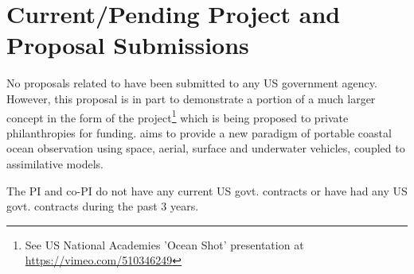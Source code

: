 \section{Current/Pending Project and Proposal Submissions}
\label{sec:current}

No proposals related to \proj have been submitted to any US government
agency. However, this proposal is in part to demonstrate a portion of
a much larger concept in the form of the \met project\footnote{See US
  National Academies 'Ocean Shot' presentation at
  \url{https://vimeo.com/510346249}} which is being proposed to
private philanthropies for funding. \met aims to provide a new
paradigm of portable coastal ocean observation using space, aerial,
surface and underwater vehicles, coupled to assimilative models.



The PI and co-PI do not have any current US govt. contracts or have
had any US govt. contracts during the past 3 years. %



